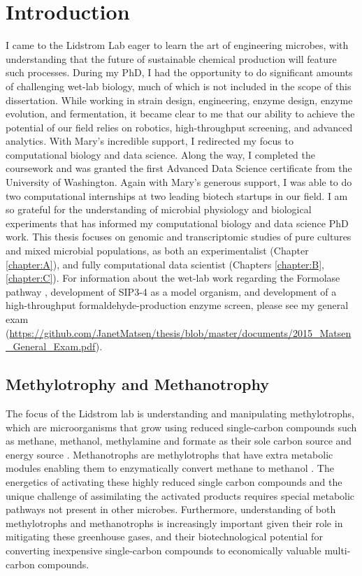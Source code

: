 \chapter{Introduction}

I came to the Lidstrom Lab eager to learn the art of engineering microbes, with understanding that the future of sustainable chemical production will feature such processes.
During my PhD, I had the opportunity to do significant amounts of challenging wet-lab biology, much of which is not included in the scope of this dissertation.
While working in strain design, engineering, enzyme design, enzyme evolution, and fermentation, it became clear to me that our ability to achieve the potential of our field relies on robotics, high-throughput screening, and advanced analytics.
With Mary's incredible support, I redirected my focus to computational biology and data science.
Along the way, I completed the coursework and was granted the first Advanced Data Science certificate from the University of Washington.
Again with Mary's generous support, I was able to do two computational internships at two leading biotech startups in our field.
I am so grateful for the understanding of microbial physiology and biological experiments that has informed my computational biology and data science PhD work.
This thesis focuses on genomic and transcriptomic studies of pure cultures and mixed microbial populations, as both an experimentalist (Chapter \ref{chapter:A}), and fully computational data scientist (Chapters \ref{chapter:B}, \ref{chapter:C}).
For information about the wet-lab work regarding the Formolase pathway \cite{siegel2015}, development of SIP3-4 as a model organism, and development of a high-throughput formaldehyde-production enzyme screen, please see my general exam (\url{https://github.com/JanetMatsen/thesis/blob/master/documents/2015_Matsen_General_Exam.pdf}).

\section{Methylotrophy and Methanotrophy}
The focus of the Lidstrom lab is understanding and manipulating methylotrophs, which are microorganisms that grow using reduced single-carbon compounds such as methane, methanol, methylamine and formate as their sole carbon source and energy source \cite{anthony1982,mila2009}.
Methanotrophs are methylotrophs that have extra metabolic modules enabling them to enzymatically convert methane to methanol \cite{kalyuzhnaya2015}.
The energetics of activating these highly reduced single carbon compounds and the unique challenge of assimilating the activated products requires special metabolic pathways not present in other microbes.
Furthermore, understanding of both methylotrophs and methanotrophs is increasingly important given their role in mitigating these greenhouse gases, and their biotechnological potential for converting inexpensive single-carbon compounds to economically valuable multi-carbon compounds.

